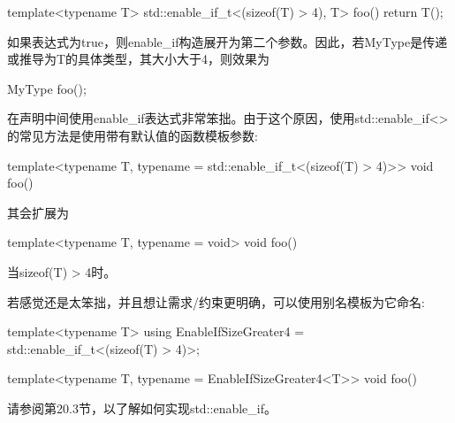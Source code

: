 \begin{cpp}
template<typename T>
std::enable_if_t<(sizeof(T) > 4), T>
foo() {
	return T();
}
\end{cpp}

如果表达式为true，则enable\_if构造展开为第二个参数。因此，若MyType是传递或推导为T的具体类型，其大小大于4，则效果为

\begin{cpp}
MyType foo();
\end{cpp}

在声明中间使用enable\_if表达式非常笨拙。由于这个原因，使用std::enable\_if<>的常见方法是使用带有默认值的函数模板参数: 

\begin{cpp}
template<typename T,
		typename = std::enable_if_t<(sizeof(T) > 4)>>
void foo() {
}
\end{cpp}

其会扩展为

\begin{cpp}
template<typename T,
		typename = void>
void foo() {
}
\end{cpp}

当sizeof(T) > 4时。

若感觉还是太笨拙，并且想让需求/约束更明确，可以使用别名模板为它命名:

\begin{cpp}
template<typename T>
using EnableIfSizeGreater4 = std::enable_if_t<(sizeof(T) > 4)>;

template<typename T,
	typename = EnableIfSizeGreater4<T>>
void foo() {
}
\end{cpp}

请参阅第20.3节，以了解如何实现std::enable\_if。










